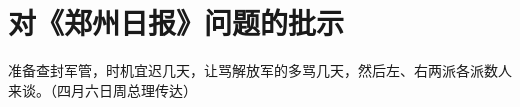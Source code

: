 \section[对《郑州日报》问题的批示（一九六七年二月）]{对《郑州日报》问题的批示}


准备查封军管，时机宜迟几天，让骂解放军的多骂几天，然后左、右两派各派数人来谈。（四月六日周总理传达）

